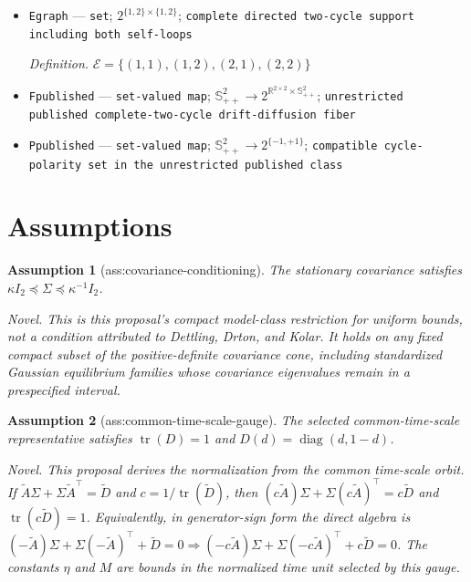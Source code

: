 \documentclass{article}
\newtheorem{assumption}{Assumption}
\begin{document}
\begin{itemize}
  \item \texttt{Egraph} --- \texttt{set}; \(2^{\{1,2\}\times\{1,2\}}\); \texttt{complete directed two-\allowbreak{}cycle support including both self-\allowbreak{}loops}
  \par\smallskip\noindent\emph{Definition.} \(\mathcal E=\{(1,1),(1,2),(2,1),(2,2)\}\)
  \item \texttt{Fpublished} --- \texttt{set-\allowbreak{}valued map}; \(\mathbb S_{++}^{2}\to2^{\mathbb R^{2\times2}\times\mathbb S_{++}^{2}}\); \texttt{unrestricted published complete-\allowbreak{}two-\allowbreak{}cycle drift-\allowbreak{}diffusion fiber}
  \item \texttt{Ppublished} --- \texttt{set-\allowbreak{}valued map}; \(\mathbb S_{++}^{2}\to2^{\{-1,+1\}}\); \texttt{compatible cycle-\allowbreak{}polarity set in the unrestricted published class}
\end{itemize}

\section{Assumptions}

\begin{assumption}[ass:covariance-conditioning]\label{ass:covariance-conditioning}
The stationary covariance satisfies \(\kappa I_2\preceq\Sigma\preceq\kappa^{-1}I_2\).
\par\smallskip\noindent\emph{Novel.} This is this proposal's compact model-class restriction for uniform bounds, not a condition attributed to Dettling, Drton, and Kolar. It holds on any fixed compact subset of the positive-definite covariance cone, including standardized Gaussian equilibrium families whose covariance eigenvalues remain in a prespecified interval.
\end{assumption}

\begin{assumption}[ass:common-time-scale-gauge]\label{ass:common-time-scale-gauge}
The selected common-time-scale representative satisfies \(\operatorname{tr}(D)=1\) and \(D(d)=\operatorname{diag}(d,1-d)\).
\par\smallskip\noindent\emph{Novel.} This proposal derives the normalization from the common time-scale orbit. If \(\widetilde A\Sigma+\Sigma\widetilde A^{\top}=\widetilde D\) and \(c=1/\operatorname{tr}(\widetilde D)\), then \((c\widetilde A)\Sigma+\Sigma(c\widetilde A)^{\top}=c\widetilde D\) and \(\operatorname{tr}(c\widetilde D)=1\). Equivalently, in generator-sign form the direct algebra is \((-\widetilde A)\Sigma+\Sigma(-\widetilde A)^{\top}+\widetilde D=0\Rightarrow(-c\widetilde A)\Sigma+\Sigma(-c\widetilde A)^{\top}+c\widetilde D=0\). The constants \(\eta\) and \(M\) are bounds in the normalized time unit selected by this gauge.
\end{assumption}
\end{document}
